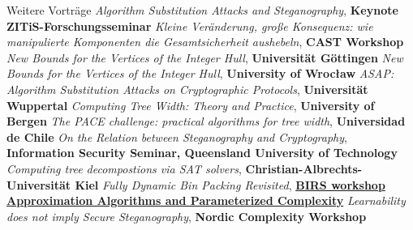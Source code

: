 \begin{rubric}{Weitere Vorträge}
\entry*[2021] \emph{Algorithm Substitution Attacks and Steganography}, \textbf{Keynote ZITiS-Forschungsseminar}
\entry*[2021] \emph{Kleine Veränderung, große Konsequenz: wie manipulierte Komponenten
die Gesamtsicherheit aushebeln}, \textbf{CAST Workshop}
\entry*[2020] \emph{New Bounds for the Vertices of the Integer Hull}, \textbf{Universität
Göttingen}
\entry*[2020] \emph{New Bounds for the Vertices of the Integer Hull}, \textbf{University of
Wrocław}
\entry*[2020] \emph{ASAP: Algorithm Substitution Attacks on Cryptographic Protocols},
\textbf{Universität Wuppertal}
\entry*[2018] \emph{Computing Tree Width: Theory and Practice}, \textbf{University of Bergen}
\entry*[2017] \emph{The PACE challenge: practical algorithms for tree width},
\textbf{Universidad de Chile}
\entry*[2016] \emph{On the Relation between Steganography and Cryptography},
\textbf{Information Security Seminar, Queensland University of Technology}
\entry*[2016] \emph{Computing tree decompostions via SAT solvers},
\textbf{Christian-Albrechts-Universität Kiel}
\entry*[2015] \emph{Fully Dynamic Bin Packing Revisited},
 \href{http://www.birs.ca/events/2015/5-day-workshops/15w5118}{\textbf{BIRS workshop Approximation
   Algorithms and Parameterized Complexity}} 
  \entry*[2015] \emph{Learnability does not imply Secure
Steganography}, \textbf{Nordic Complexity Workshop}
\end{rubric}